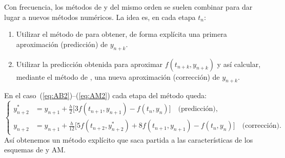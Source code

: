 \begin{example}
  Con frecuencia, los métodos de \AB y \AM del mismo orden se suelen
  combinar para dar lugar a nuevos métodos numéricos. La idea es, en
  cada etapa $t_n$:
  \begin{enumerate}
  \item Utilizar el método de \AB para obtener, de forma explícita una
    primera aproximación (predicción) de $y_{n+k}$.
  \item Utilizar la predicción obtenida para aproximar
    $f(t_{n+k},y_{n+k})$ y así calcular, mediante el método de \AM,
    una nueva aproximación (corrección) de $y_{n+k}$.
  \end{enumerate}

  En el caso~(\ref{eq:AB2})--(\ref{eq:AM2}) cada etapa del método
  queda:
  \begin{equation*}\left\{
      \begin{aligned}
        y^*_{n+2} &= y_{n+1} + \frac{h}{2} \big[ 3f(t_{n+1},y_{n+1}) -
        f(t_{n},y_{n}) \big] \quad \text{(predicción),}
        \\
        y_{n+2} &= y_{n+1} + \frac{h}{12} \big[ 5f(t_{n+2},y^*_{n+2})
        + 8 f(t_{n+1},y_{n+1}) - f(t_{n},y_{n}) \big] \quad
        \text{(corrección).}
      \end{aligned}\right.
  \end{equation*}
  Así obtenemos un método explícito que saca partida a las
  características de los esquemas de \AB y AM.
  \end{example}

